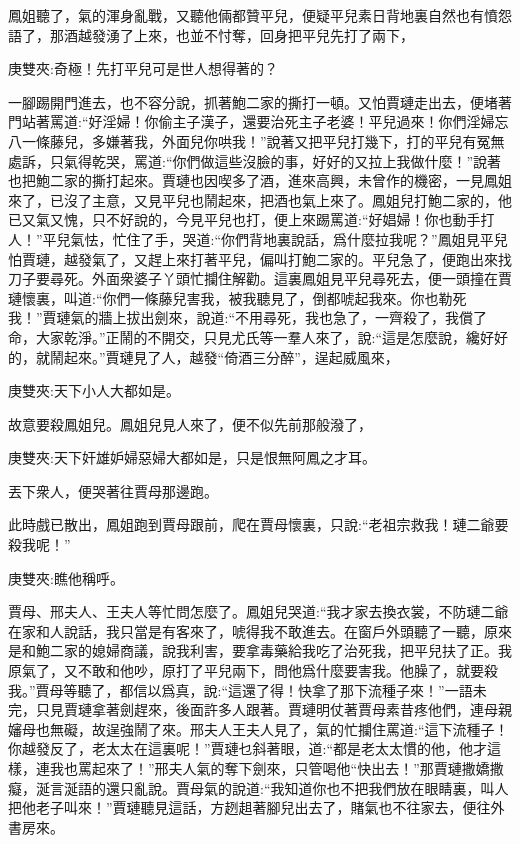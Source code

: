 \begin{parag}
    鳳姐聽了，氣的渾身亂戰，又聽他倆都贊平兒，便疑平兒素日背地裏自然也有憤怨語了，那酒越發湧了上來，也並不忖奪，回身把平兒先打了兩下，\begin{note}庚雙夾:奇極！先打平兒可是世人想得著的？\end{note}一腳踢開門進去，也不容分說，抓著鮑二家的撕打一頓。又怕賈璉走出去，便堵著門站著罵道:“好淫婦！你偷主子漢子，還要治死主子老婆！平兒過來！你們淫婦忘八一條藤兒，多嫌著我，外面兒你哄我！”說著又把平兒打幾下，打的平兒有冤無處訴，只氣得乾哭，罵道:“你們做這些沒臉的事，好好的又拉上我做什麼！”說著也把鮑二家的撕打起來。賈璉也因喫多了酒，進來高興，未曾作的機密，一見鳳姐來了，已沒了主意，又見平兒也鬧起來，把酒也氣上來了。鳳姐兒打鮑二家的，他已又氣又愧，只不好說的，今見平兒也打，便上來踢罵道:“好娼婦！你也動手打人！”平兒氣怯，忙住了手，哭道:“你們背地裏說話，爲什麼拉我呢？”鳳姐見平兒怕賈璉，越發氣了，又趕上來打著平兒，偏叫打鮑二家的。平兒急了，便跑出來找刀子要尋死。外面衆婆子丫頭忙攔住解勸。這裏鳳姐見平兒尋死去，便一頭撞在賈璉懷裏，叫道:“你們一條藤兒害我，被我聽見了，倒都唬起我來。你也勒死我！”賈璉氣的牆上拔出劍來，說道:“不用尋死，我也急了，一齊殺了，我償了命，大家乾淨。”正鬧的不開交，只見尤氏等一羣人來了，說:“這是怎麼說，纔好好的，就鬧起來。”賈璉見了人，越發“倚酒三分醉”，逞起威風來，\begin{note}庚雙夾:天下小人大都如是。\end{note}故意要殺鳳姐兒。鳳姐兒見人來了，便不似先前那般潑了，\begin{note}庚雙夾:天下奸雄妒婦惡婦大都如是，只是恨無阿鳳之才耳。\end{note}丟下衆人，便哭著往賈母那邊跑。
\end{parag}


\begin{parag}
    此時戲已散出，鳳姐跑到賈母跟前，爬在賈母懷裏，只說:“老祖宗救我！璉二爺要殺我呢！”\begin{note}庚雙夾:瞧他稱呼。\end{note}賈母、邢夫人、王夫人等忙問怎麼了。鳳姐兒哭道:“我才家去換衣裳，不防璉二爺在家和人說話，我只當是有客來了，唬得我不敢進去。在窗戶外頭聽了一聽，原來是和鮑二家的媳婦商議，說我利害，要拿毒藥給我吃了治死我，把平兒扶了正。我原氣了，又不敢和他吵，原打了平兒兩下，問他爲什麼要害我。他臊了，就要殺我。”賈母等聽了，都信以爲真，說:“這還了得！快拿了那下流種子來！”一語未完，只見賈璉拿著劍趕來，後面許多人跟著。賈璉明仗著賈母素昔疼他們，連母親嬸母也無礙，故逞強鬧了來。邢夫人王夫人見了，氣的忙攔住罵道:“這下流種子！你越發反了，老太太在這裏呢！”賈璉乜斜著眼，道:“都是老太太慣的他，他才這樣，連我也罵起來了！”邢夫人氣的奪下劍來，只管喝他“快出去！”那賈璉撒嬌撒癡，涎言涎語的還只亂說。賈母氣的說道:“我知道你也不把我們放在眼睛裏，叫人把他老子叫來！”賈璉聽見這話，方趔趄著腳兒出去了，賭氣也不往家去，便往外書房來。
\end{parag}


